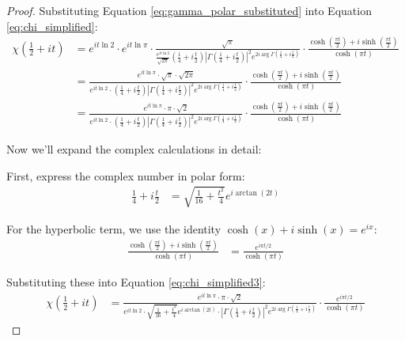 \documentclass{article}
\begin{document}
\begin{proof}
Substituting Equation \eqref{eq:gamma_polar_substituted} into Equation \eqref{eq:chi_simplified}:
\begin{align}
\chi\left(\frac{1}{2}+it\right) &= e^{it\ln 2} \cdot e^{it\ln\pi} \cdot \frac{\sqrt{\pi}}{\frac{e^{it\ln 2}}{\sqrt{2\pi}}\left(\frac{1}{4}+i\frac{t}{2}\right)\left|\Gamma\left(\frac{1}{4}+i\frac{t}{2}\right)\right|^2e^{2i\arg\Gamma\left(\frac{1}{4}+i\frac{t}{2}\right)}} \cdot \frac{\cosh\left(\frac{\pi t}{2}\right) + i\sinh\left(\frac{\pi t}{2}\right)}{\cosh(\pi t)} \label{eq:chi_with_gamma}\\
&= \frac{e^{it\ln\pi} \cdot \sqrt{\pi} \cdot \sqrt{2\pi}}{e^{it\ln 2} \cdot \left(\frac{1}{4}+i\frac{t}{2}\right)\left|\Gamma\left(\frac{1}{4}+i\frac{t}{2}\right)\right|^2e^{2i\arg\Gamma\left(\frac{1}{4}+i\frac{t}{2}\right)}} \cdot \frac{\cosh\left(\frac{\pi t}{2}\right) + i\sinh\left(\frac{\pi t}{2}\right)}{\cosh(\pi t)} \label{eq:chi_simplified2}\\
&= \frac{e^{it\ln\pi} \cdot \pi \cdot \sqrt{2}}{e^{it\ln 2} \cdot \left(\frac{1}{4}+i\frac{t}{2}\right)\left|\Gamma\left(\frac{1}{4}+i\frac{t}{2}\right)\right|^2e^{2i\arg\Gamma\left(\frac{1}{4}+i\frac{t}{2}\right)}} \cdot \frac{\cosh\left(\frac{\pi t}{2}\right) + i\sinh\left(\frac{\pi t}{2}\right)}{\cosh(\pi t)} \label{eq:chi_simplified3}
\end{align}

Now we'll expand the complex calculations in detail:

First, express the complex number in polar form:
\begin{align}
\frac{1}{4}+i\frac{t}{2} &= \sqrt{\frac{1}{16} + \frac{t^2}{4}}e^{i\arctan(2t)} \label{eq:complex_polar}
\end{align}

For the hyperbolic term, we use the identity $\cosh(x) + i\sinh(x) = e^{ix}$:
\begin{align}
\frac{\cosh\left(\frac{\pi t}{2}\right) + i\sinh\left(\frac{\pi t}{2}\right)}{\cosh(\pi t)} &= \frac{e^{i\pi t/2}}{\cosh(\pi t)} \label{eq:hyperbolic_identity}
\end{align}

Substituting these into Equation \eqref{eq:chi_simplified3}:
\begin{align}
\chi\left(\frac{1}{2}+it\right) &= \frac{e^{it\ln\pi} \cdot \pi \cdot \sqrt{2}}{e^{it\ln 2} \cdot \sqrt{\frac{1}{16} + \frac{t^2}{4}}e^{i\arctan(2t)} \cdot \left|\Gamma\left(\frac{1}{4}+i\frac{t}{2}\right)\right|^2e^{2i\arg\Gamma\left(\frac{1}{4}+i\frac{t}{2}\right)}} \cdot \frac{e^{i\pi t/2}}{\cosh(\pi t)} \label{eq:chi_complex1}
\end{align}


\end{proof}
\end{document}
